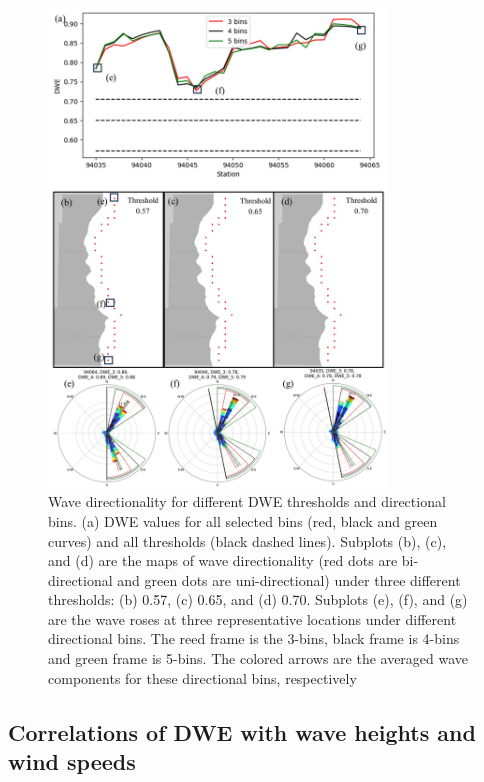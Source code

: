 \begin{figure}[htbp]
  \centering
  \includegraphics[width=0.8\textwidth]{chapter3/resources/figure3-9.jpg}
  \caption{Wave directionality for different DWE thresholds and directional bins. (a) DWE values for all selected bins (red, black and green curves) and all thresholds (black dashed lines). Subplots (b), (c), and (d) are the maps of wave directionality (red dots are bi-directional and green dots are uni-directional) under three different thresholds: (b) 0.57, (c) 0.65, and (d) 0.70. Subplots (e), (f), and (g) are the wave roses at three representative locations under different directional bins. The reed frame is the 3-bins, black frame is 4-bins and green frame is 5-bins. The colored arrows are the averaged wave components for these directional bins, respectively}
  \label{fig:fig3.9}
\end{figure}

\subsection{Correlations of DWE with wave heights and wind speeds}
\label{c3_Correlations of DWE with wave heights and wind speeds}

